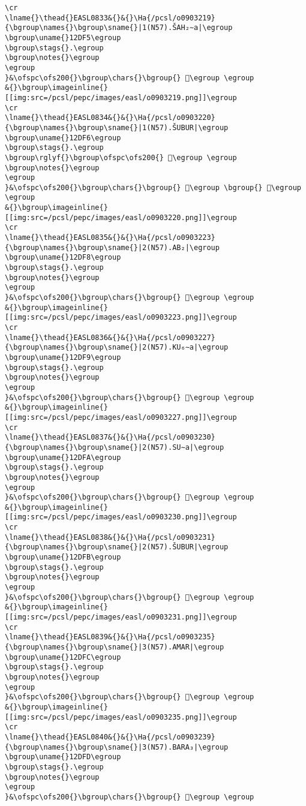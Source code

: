 \begin{verbatim}
\cr
\lname{}\thead{}EASL0833&{}&{}\Ha{/pcsl/o0903219}{\bgroup\names{}\bgroup\sname{}|1(N57).ŠAH₂∼a|\egroup
\bgroup\uname{}12DF5\egroup
\bgroup\stags{}.\egroup
\bgroup\notes{}\egroup
\egroup
}&\ofspc\ofs200{}\bgroup\chars{}\bgroup{} 𒷵\egroup \egroup
&{}\bgroup\imageinline{}[[img:src=/pcsl/pepc/images/easl/o0903219.png]]\egroup
\cr
\lname{}\thead{}EASL0834&{}&{}\Ha{/pcsl/o0903220}{\bgroup\names{}\bgroup\sname{}|1(N57).ŠUBUR|\egroup
\bgroup\uname{}12DF6\egroup
\bgroup\stags{}.\egroup
\bgroup\rglyf{}\bgroup\ofspc\ofs200{} 𒷶\egroup \egroup
\bgroup\notes{}\egroup
\egroup
}&\ofspc\ofs200{}\bgroup\chars{}\bgroup{} 𒷷\egroup \bgroup{} 𒷶\egroup \egroup
&{}\bgroup\imageinline{}[[img:src=/pcsl/pepc/images/easl/o0903220.png]]\egroup
\cr
\lname{}\thead{}EASL0835&{}&{}\Ha{/pcsl/o0903223}{\bgroup\names{}\bgroup\sname{}|2(N57).AB₂|\egroup
\bgroup\uname{}12DF8\egroup
\bgroup\stags{}.\egroup
\bgroup\notes{}\egroup
\egroup
}&\ofspc\ofs200{}\bgroup\chars{}\bgroup{} 𒷸\egroup \egroup
&{}\bgroup\imageinline{}[[img:src=/pcsl/pepc/images/easl/o0903223.png]]\egroup
\cr
\lname{}\thead{}EASL0836&{}&{}\Ha{/pcsl/o0903227}{\bgroup\names{}\bgroup\sname{}|2(N57).KU₆∼a|\egroup
\bgroup\uname{}12DF9\egroup
\bgroup\stags{}.\egroup
\bgroup\notes{}\egroup
\egroup
}&\ofspc\ofs200{}\bgroup\chars{}\bgroup{} 𒷹\egroup \egroup
&{}\bgroup\imageinline{}[[img:src=/pcsl/pepc/images/easl/o0903227.png]]\egroup
\cr
\lname{}\thead{}EASL0837&{}&{}\Ha{/pcsl/o0903230}{\bgroup\names{}\bgroup\sname{}|2(N57).SU∼a|\egroup
\bgroup\uname{}12DFA\egroup
\bgroup\stags{}.\egroup
\bgroup\notes{}\egroup
\egroup
}&\ofspc\ofs200{}\bgroup\chars{}\bgroup{} 𒷺\egroup \egroup
&{}\bgroup\imageinline{}[[img:src=/pcsl/pepc/images/easl/o0903230.png]]\egroup
\cr
\lname{}\thead{}EASL0838&{}&{}\Ha{/pcsl/o0903231}{\bgroup\names{}\bgroup\sname{}|2(N57).ŠUBUR|\egroup
\bgroup\uname{}12DFB\egroup
\bgroup\stags{}.\egroup
\bgroup\notes{}\egroup
\egroup
}&\ofspc\ofs200{}\bgroup\chars{}\bgroup{} 𒷻\egroup \egroup
&{}\bgroup\imageinline{}[[img:src=/pcsl/pepc/images/easl/o0903231.png]]\egroup
\cr
\lname{}\thead{}EASL0839&{}&{}\Ha{/pcsl/o0903235}{\bgroup\names{}\bgroup\sname{}|3(N57).AMAR|\egroup
\bgroup\uname{}12DFC\egroup
\bgroup\stags{}.\egroup
\bgroup\notes{}\egroup
\egroup
}&\ofspc\ofs200{}\bgroup\chars{}\bgroup{} 𒷼\egroup \egroup
&{}\bgroup\imageinline{}[[img:src=/pcsl/pepc/images/easl/o0903235.png]]\egroup
\cr
\lname{}\thead{}EASL0840&{}&{}\Ha{/pcsl/o0903239}{\bgroup\names{}\bgroup\sname{}|3(N57).BARA₃|\egroup
\bgroup\uname{}12DFD\egroup
\bgroup\stags{}.\egroup
\bgroup\notes{}\egroup
\egroup
}&\ofspc\ofs200{}\bgroup\chars{}\bgroup{} 𒷽\egroup \egroup

\end{verbatim}
